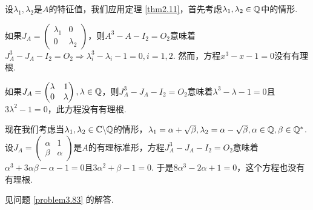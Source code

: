 \begin{solution}
  \begin{inparaenum}[(a)]
    \item 设$\lambda_1,\lambda_2$是$A$的特征值，我们应用定理 \ref{thm2.11}，首先考虑$\lambda_1,\lambda_2\in\mathbb Q$中的情形.

        如果$J_A=\begin{pmatrix}
          \lambda_1 & 0 \\
          0 & \lambda_2
        \end{pmatrix}$，则$A^3-A-I_2=O_2$意味着$J_A^3-J_A-I_2=O_2\Rightarrow \lambda_i^3-\lambda_i-1=0,i=1,2$. 然而，方程$x^3-x-1=0$没有有理根.

        如果$J_A=\begin{pmatrix}
          \lambda & 1 \\
          0 & \lambda
        \end{pmatrix},\lambda\in\mathbb Q$，则$J_A^3-J_A-I_2=O_2$意味着$\lambda^3-\lambda-1=0$且$3\lambda^2-1=0$，此方程没有有理根.

        现在我们考虑当$\lambda_1,\lambda_2\in\mathbb C\backslash \mathbb Q$的情形，$\lambda_1=\alpha+\sqrt\beta,\lambda_2=\alpha
        -\sqrt\beta,\alpha\in\mathbb Q,\beta\in\mathbb Q^\ast$. 设$J_A=\begin{pmatrix}
          \alpha & 1 \\
          \beta & \alpha
        \end{pmatrix}$是$A$的有理标准形，方程$J_A^3-J_A-I_2=O_2$意味着$\alpha^3+3\alpha\beta-\alpha-1=0$且$3\alpha^2+\beta
        -1=0$. 于是$8\alpha^3-2\alpha+1=0$，这个方程也没有有理根.

        \item 见问题 \ref{problem3.83} 的解答.
  \end{inparaenum}
\end{solution}

